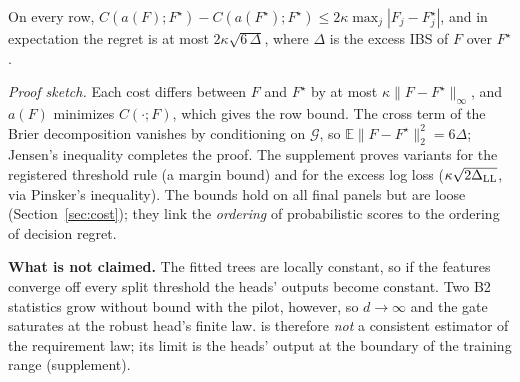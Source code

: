 \begin{theorem}
\label{thm:regret}
On every row, $C(a(F);F^\star)-C(a(F^\star);F^\star)\le2\kappa\max_j|F_j-F^\star_j|$, and in expectation the regret is at most $2\kappa\sqrt{6\,\Delta}$, where $\Delta$ is the excess IBS of $F$ over $F^\star$.
\end{theorem}
\noindent\emph{Proof sketch.} Each cost differs between $F$ and $F^\star$ by at most $\kappa\|F-F^\star\|_\infty$, and $a(F)$ minimizes $C(\cdot;F)$, which gives the row bound. The cross term of the Brier decomposition vanishes by conditioning on $\mathcal G$, so $\mathbb E\|F-F^\star\|_2^2=6\Delta$; Jensen's inequality completes the proof. The supplement proves variants for the registered threshold rule (a margin bound) and for the excess log loss ($\kappa\sqrt{2\Delta_{\rm LL}}$, via Pinsker's inequality). The bounds hold on all final panels but are loose (Section~\ref{sec:cost}); they link the \emph{ordering} of probabilistic scores to the ordering of decision regret.

\textbf{What is not claimed.} The fitted trees are locally constant, so if the features converge off every split threshold the heads' outputs become constant. Two B2 statistics grow without bound with the pilot, however, so $d\to\infty$ and the gate saturates at the robust head's finite law. \OEH{} is therefore \emph{not} a consistent estimator of the requirement law; its limit is the heads' output at the boundary of the training range (supplement).
